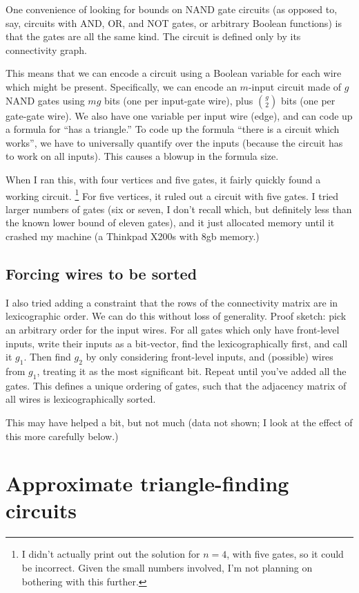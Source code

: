 \documentclass[12pt]{article}
\begin{document}
One convenience of looking for bounds on NAND gate circuits
(as opposed to, say, circuits with AND, OR, and NOT gates,
or arbitrary Boolean functions) is that the gates are all
the same kind. The circuit is defined only by its
connectivity graph.

This means that we can encode a circuit
using a Boolean variable for each wire which might be
present. Specifically, we can encode an $m$-input circuit
made of $g$ NAND gates using $mg$ bits (one per input-gate
wire), plus $g \choose 2$ bits (one per gate-gate wire).
We also have one variable per input wire (edge), and can code up
a formula for ``has a triangle.''
To code up the formula ``there is a circuit which works'', we
have to universally quantify over the inputs (because the
circuit has to work on all inputs). This causes a
blowup in the formula size.

When I ran this, with four vertices and five gates, it
fairly quickly found a working circuit. 
\footnote{I didn't actually print out the solution for $n=4$, with
five gates, so it could be incorrect. Given the small numbers
involved, I'm not planning on bothering with this further.}
For five vertices, it ruled out a circuit with five gates.
I tried larger numbers of gates (six or seven, I don't recall
which, but definitely less than the known lower bound of eleven
gates), and it just allocated memory until it crashed
my machine (a Thinkpad X200s with 8gb memory.)

\subsection{Forcing wires to be sorted}

I also tried adding a constraint that the rows of
the connectivity matrix are in lexicographic order.
We can do this without loss of generality. Proof sketch:
pick an arbitrary order for the input wires. For all gates
which only have front-level inputs, write their inputs as
a bit-vector, find the lexicographically first, and call it
$g_1$. Then find $g_2$ by only considering front-level inputs,
and (possible) wires from $g_1$, treating it as the most significant bit.
Repeat until you've added all the gates.
This defines a unique ordering of gates, such that the adjacency
matrix of all wires is lexicographically sorted.

This may have helped a bit, but not much (data not shown; I
look at the effect of this more carefully below.)

\section{Approximate triangle-finding circuits}
\end{document}
